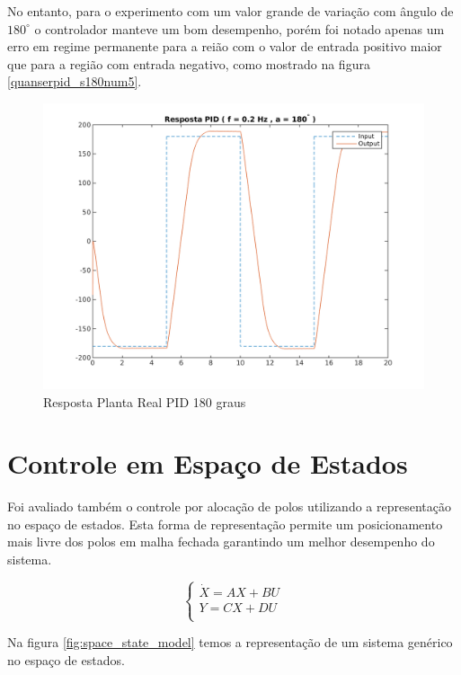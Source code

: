 \documentclass[a4paper,11pt]{article}
\begin{document}
No entanto, para o experimento com um valor grande de variação com ângulo de $180^\circ$ o controlador manteve um bom desempenho, porém foi notado apenas um erro em regime permanente para a reião com o valor de entrada positivo maior que para a região com entrada negativo, como mostrado na figura \ref{quanserpid_s180num5}.

\begin{figure}[H]
    \centering
    \includegraphics[width=0.8\linewidth]{tex/img/quanserpid_s180num5.png}
    \caption{Resposta Planta Real PID 180 graus}
    \label{fig:quanserpid_s180num5}
\end{figure}

\section{Controle em Espaço de Estados}

Foi avaliado também o controle por alocação de polos utilizando a representação no espaço de estados. Esta forma de representação permite um posicionamento mais livre dos polos em malha fechada garantindo um melhor desempenho do sistema.

\begin{equation}
\left\{
\begin{array}{c}
    \dot{X} = A X + B U \\
    Y = C X + D U \\
\end{array}
\right.
\end{equation}

Na figura \ref{fig:space_state_model} temos a representação de um sistema genérico no espaço de estados.
\end{document}
